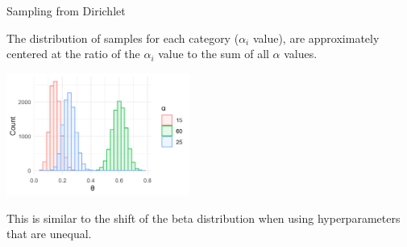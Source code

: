\documentclass[
  ignorenonframetext,
]{beamer}
\begin{document}
\begin{frame}{Sampling from Dirichlet}
\protect\hypertarget{sampling-from-dirichlet}{}

\footnotesize

The distribution of samples for each category (\(\alpha_{i}\) value),
are approximately centered at the ratio of the \(\alpha_{i}\) value to
the sum of all \(\alpha\) values.

\begin{center}\includegraphics[width=6cm,height=4cm]{figures/DirchletSamples1} \end{center}

This is similar to the shift of the beta distribution when using
hyperparameters that are unequal.

\end{frame}
\end{document}
